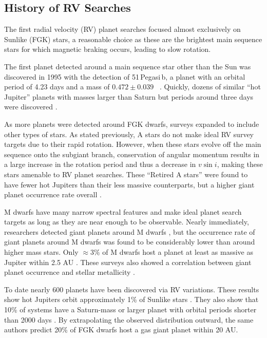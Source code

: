 \subsection{History of RV Searches}
The first radial velocity (RV) planet searches focused almost exclusively on Sunlike
(FGK) stars, a reasonable choice as these are the brightest main sequence stars for 
which magnetic braking occurs, leading to slow rotation.

The first planet detected around a main sequence star other than the Sun was discovered
in 1995 with the detection of 51\,Pegasi\,b, a planet with an orbital period of 4.23 days
and a mass of $0.472 \pm 0.039$ \mjup\ \citep{Mayor95}.
Quickly, dozens of similar ``hot Jupiter'' planets with masses larger than Saturn but 
periods around three days were discovered \citep[e.g.][]{Marcy98, Butler97, Wright07}.

As more planets were detected around FGK dwarfs, surveys expanded to include other
types of stars.
As stated previously, A stars do not make ideal RV survey targets due to their rapid
rotation.
However, when these stars evolve off the main sequence onto the subgiant branch,
conservation of angular momentum results in a large increase in the rotation period and
thus a decrease in $v \sin i$, making these stars amenable to RV planet searches.
These ``Retired A stars'' were found to have fewer hot Jupiters than their less massive
counterparts, but a higher giant planet occurrence rate overall \citep{Johnson07b,
Johnson11b, Bowler10}.

M dwarfs have many narrow spectral features and make ideal planet search targets as
long as they are near enough to be observable.
Nearly immediately, researchers detected giant planets around M dwarfs \citep{Butler04, Butler06}, but the occurrence rate of giant planets around M dwarfs was found to be 
considerably lower than around higher mass stars.
Only $\approx 3\%$ of M dwarfs host a planet at least as massive as Jupiter 
within 2.5 AU \citep{Johnson10a, Bonfils13}.
These surveys also showed a correlation between giant planet occurrence and stellar
metallicity \citep{Fischer05, JohnsonApps09}.



To date nearly 600 planets have been discovered via RV variations.
These results show hot Jupiters orbit approximately 1\% of Sunlike stars \citep{Wright12}.
They also show that 10\% of systems have a Saturn-mass or larger planet with orbital periods
shorter than 2000 days \citep{Cumming08}.
By extrapolating the observed distribution outward, the same authors predict 20\% of FGK dwarfs host a gas giant planet within 20 AU.

